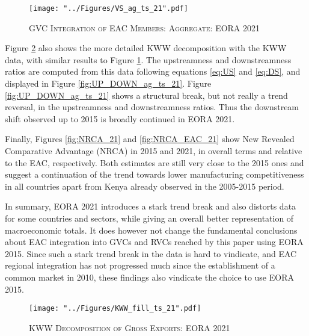 \documentclass[a4paper]{article}
\begin{document}
\begin{figure}[h!] %
\centering
\caption{\label{fig:VSag_ts_21}\textsc{GVC Integration of EAC Members: Aggregate: EORA 2021}}
\texttt{[image: "../Figures/VS\_ag\_ts\_21".pdf]} %
\end{figure}
\FloatBarrier

Figure \ref{fig:KWW_fill_ts_21} also shows the more detailed KWW decomposition with the KWW data, with similar results to Figure \ref{fig:VSag_ts_21}. The upstreamness and downstreamness ratios are computed from this data following equations \ref{eq:US} and \ref{eq:DS}, and displayed in Figure \ref{fig:UP_DOWN_ag_ts_21}. Figure \ref{fig:UP_DOWN_ag_ts_21} shows a structural break, but not really a trend reversal, in the upstreamness and downstreamness ratios. Thus the downstream shift observed up to 2015 is broadly continued in EORA 2021. \newline

Finally, Figures \ref{fig:NRCA_21} and \ref{fig:NRCA_EAC_21} show New Revealed Comparative Advantage (NRCA) in 2015 and 2021, in overall terms and relative to the EAC, respectively. Both estimates are still very close to the 2015 ones and suggest a continuation of the trend towards lower manufacturing competitiveness in all countries apart from Kenya already observed in the 2005-2015 period. \newline

In summary, EORA 2021 introduces a stark trend break and also distorts data for some countries and sectors, while giving an overall better representation of macroeconomic totals. It does however not change the fundamental conclusions about EAC integration into GVCs and RVCs reached by this paper using EORA 2015. Since such a stark trend break in the data is hard to vindicate, and EAC regional integration has not progressed much since the establishment of a common market in 2010, these findings also vindicate the choice to use EORA 2015.  


\begin{figure}[h!]
\centering
\caption{\label{fig:KWW_fill_ts_21}\textsc{KWW Decomposition of Gross Exports: EORA 2021}}
\texttt{[image: "../Figures/KWW\_fill\_ts\_21".pdf]} %
\end{figure}
\FloatBarrier
 
\end{document}
